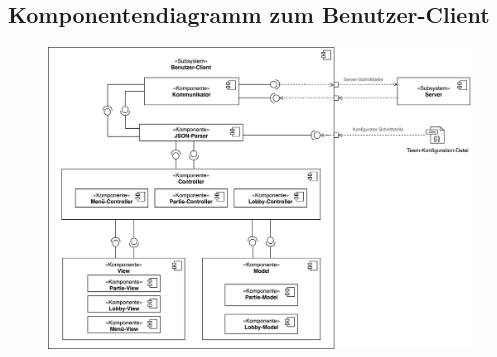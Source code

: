 \subsection{Komponentendiagramm zum Benutzer-Client}
\begin{figure}[H]
    \centering
    \includegraphics[scale=0.13]{../Meilenstein05/images/komponentendiagramm_benutzer-client.png}
\end{figure}

